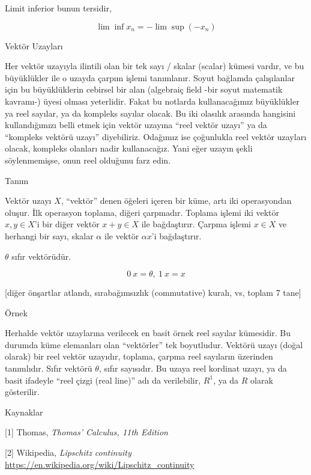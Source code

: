 \documentclass[12pt,fleqn]{article}\usepackage{../../common}
\begin{document}
Limit inferior bunun tersidir, 

$$ \lim \inf x_n  = -\lim \sup(-x_n)$$

Vektör Uzayları 

Her vektör uzayıyla ilintili olan bir tek sayı / skalar (scalar) kümesi vardır,
ve bu büyüklükler ile o uzayda çarpım işlemi tanımlanır. Soyut bağlamda
çalışılanlar için bu büyüklüklerin cebirsel bir alan (algebraiç field -bir soyut
matematik kavramı-) üyesi olması yeterlidir. Fakat bu notlarda kullanacağımız
büyüklükler ya reel sayılar, ya da kompleks sayılar olacak. Bu iki olasılık
arasında hangisini kullandığımızı belli etmek için vektör uzayına ``reel vektör
uzayı'' ya da ``kompleks vektörü uzayı'' diyebiliriz. Odağımız ise çoğunlukla
reel vektör uzayları olacak, kompleks olanları nadir kullanacağız. Yani eğer
uzayın şekli söylenmemişse, onun reel olduğunu farz edin.

Tanım 

Vektör uzayı $X$, ``vektör'' denen öğeleri içeren bir küme, artı iki
operasyondan oluşur. İlk operasyon toplama, diğeri çarpmadır. Toplama işlemi iki
vektör $x,y \in X$'i bir diğer vektör $x+y \in X$ ile bağdaştırır. Çarpma işlemi
$x \in X$ ve herhangi bir sayı, skalar $\alpha$ ile vektör $\alpha x$'i
bağdaştırır.

$\theta$ sıfır vektörüdür. 

$$  0 \ x = \theta, \ 1 \ x = x $$

[diğer önşartlar atlandı, sırabağımsızlık (commutative) kuralı, vs, toplam 7
  tane]

Örnek

Herhalde vektör uzaylarına verilecek en basit örnek reel sayılar kümesidir. Bu
durumda küme elemanları olan ``vektörler'' tek boyutludur. Vektörü uzayı (doğal
olarak) bir reel vektör uzayıdır, toplama, çarpma reel sayıların üzerinden
tanımlıdır. Sıfır vektörü $\theta$, sıfır sayısıdır. Bu uzaya reel kordinat
uzayı, ya da basit ifadeyle ``reel çizgi (real line)'' adı da verilebilir,
$R^1$, ya da $R$ olarak gösterilir.

Kaynaklar

[1] Thomas, {\em Thomas' Calculus, 11th Edition} 

[2] Wikipedia, {\em Lipschitz continuity}
    \url{https://en.wikipedia.org/wiki/Lipschitz_continuity}
\end{document}
